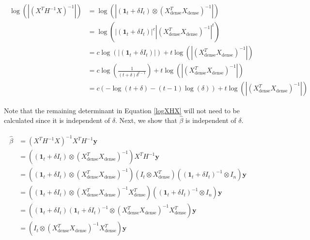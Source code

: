         \begin{align}
        \begin{split}
            \log{\left(|(X^TH^{-1}X)^{-1}|\right)} & = \log{(|(\mathbf{1}_{t} + \delta I_t) \otimes (X^T_{\text{dense}}X_{\text{dense}})^{-1}|)} \\
                                      & = \log{(|(\mathbf{1}_{t} + \delta I_t)|^c|(X^T_{\text{dense}}X_{\text{dense}})^{-1}|^t)} \\
                                      & = c\log{(|(\mathbf{1}_{t} + \delta I_t)|)} + t\log{(|(X^T_{\text{dense}}X_{\text{dense}})^{-1}|)} \\
                                      & = c\log{\left(\frac{1}{(t+\delta)\delta^{t-1}}\right)} + t\log{(|(X^T_{\text{dense}}X_{\text{dense}})^{-1}|)} \\
                                      & = c\left(-\log{(t+\delta)} - (t-1)\log{(\delta)}\right) + t\log{(|(X^T_{\text{dense}}X_{\text{dense}})^{-1}|)} \label{logXHX}
        \end{split}
        \end{align}
        
        \noindent Note that the remaining determinant in Equation \ref{logXHX} will not need to be calculated since it is independent of $\delta$. Next, we show that $\hat{\beta}$ is independent of $\delta$.
        
        \begin{align}
        \begin{split}
            \hat{\beta} & = (X^TH^{-1}X)^{-1}X^TH^{-1}\mathbf{y} \\
                        & = \left((\mathbf{1}_{t} + \delta I_t) \otimes (X^T_{\text{dense}}X_{\text{dense}})^{-1}\right)X^TH^{-1}\mathbf{y} \\
                        & = \left((\mathbf{1}_{t} + \delta I_t) \otimes (X^T_{\text{dense}}X_{\text{dense}})^{-1}\right)(I_t \otimes X^T_{\text{dense}})((\mathbf{1}_{t} + \delta I_t)^{-1} \otimes I_n )\mathbf{y} \\
                        & = \left((\mathbf{1}_{t} + \delta I_t) \otimes (X^T_{\text{dense}}X_{\text{dense}})^{-1}X^T_{\text{dense}}\right)((\mathbf{1}_{t} + \delta I_t)^{-1} \otimes I_n )\mathbf{y} \\
                        & = \left((\mathbf{1}_{t} + \delta I_t) (\mathbf{1}_{t} + \delta I_t)^{-1}\otimes (X^T_{\text{dense}}X_{\text{dense}})^{-1}X^T_{\text{dense}}\right)\mathbf{y} \\
                        & = \left(I_t\otimes (X^T_{\text{dense}}X_{\text{dense}})^{-1}X^T_{\text{dense}}\right)\mathbf{y}
        \end{split}
        \end{align}
        
